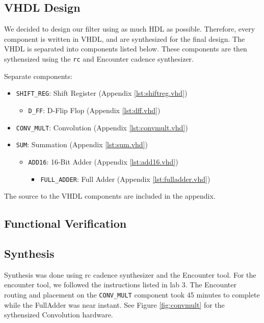 \subsection{VHDL Design}
We decided to design our filter using as much HDL as possible.  Therefore, every component is written in VHDL, and are synthesized for the final design. The VHDL is separated into components listed below.  These components are then sythensized using the \texttt{rc} and Encounter cadence synthesizer.  

Separate components:
\begin{itemize}
\item \verb=SHIFT_REG=: Shift Register (Appendix \ref{lst:shiftreg.vhd})
	\begin{itemize}
		\item \verb=D_FF=: D-Flip Flop (Appendix \ref{lst:dff.vhd})
	\end{itemize}
\item \verb=CONV_MULT=: Convolution (Appendix \ref{lst:convmult.vhd})
\item \verb=SUM=: Summation (Appendix \ref{lst:sum.vhd})
	\begin{itemize}
		\item \verb=ADD16=: 16-Bit Adder (Appendix \ref{lst:add16.vhd})
		\begin{itemize}
			\item \verb=FULL_ADDER=: Full Adder (Appendix \ref{lst:fulladder.vhd})
		\end{itemize}
	\end{itemize}
\end{itemize}

The source to the VHDL components are included in the appendix.  

\subsection{Functional Verification}



\subsection{Synthesis}
Synthesis was done using rc cadence synthesizer and the Encounter tool.  For the encounter tool, we followed the instructions listed in lab 3.  The Encounter routing and placement on the \verb=CONV_MULT= component took 45 minutes to complete while the FullAdder was near instant.  See Figure \ref{fig:convmult} for the sythensized Convolution hardware.

